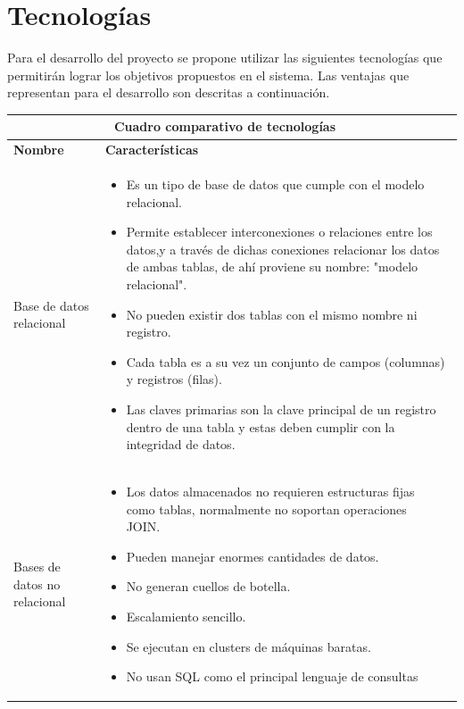 \section{Tecnologías}
Para el desarrollo del proyecto se propone utilizar las siguientes tecnologías que permitirán lograr los objetivos propuestos en el sistema. Las ventajas que representan para el desarrollo son descritas a continuación.
\vspace{10mm}
	\begin{table}[b!]
    \centering
    \vspace{-30mm}
      \begin{tabular}{|p{2cm}|ll}
        \hline
        
        \multicolumn{2}{|c|}{{\bf Cuadro comparativo de tecnologías}} \\ 
        \hline
          \multicolumn{1}{|p{4cm}|}{{\bf Nombre}} & 
		  \multicolumn{1}{p{10cm}|}{{\bf Características}}\\

        \hline
          \multicolumn{1}{|p{5cm}|}{Base de datos relacional} & 
          \multicolumn{2}{p{10cm}|}{\begin{itemize}
          \vspace{-5mm}
        \item Es un tipo de base de datos que cumple con el modelo relacional.
        \item Permite establecer interconexiones o relaciones entre los datos,y a través de dichas conexiones relacionar los datos de ambas tablas, de ahí proviene su nombre: "modelo relacional".
        \item No pueden existir dos tablas con el mismo nombre ni registro.
        \item Cada tabla es a su vez un conjunto de campos (columnas) y registros (filas).
        \item Las claves primarias son la clave principal de un registro dentro de una tabla y estas deben cumplir con la integridad de datos.\cite{28}
       
      \end{itemize}} \\
         
        \hline
          \multicolumn{1}{|p{5cm}|}{Bases de datos no relacional} & 
          \multicolumn{1}{p{10cm}|}{
          \begin{itemize}
          \vspace{-5mm}
          \item Los datos almacenados no requieren estructuras fijas como tablas, normalmente no soportan operaciones JOIN.
        \item Pueden manejar enormes cantidades de datos.
        \item No generan cuellos de botella.
        \item Escalamiento sencillo.
        \item Se ejecutan en clusters de máquinas baratas.
        \item No usan SQL como el principal lenguaje de consultas \cite{29}
      \end{itemize}} \\ 
       \hline
        

\end{tabular}
\end{table}
